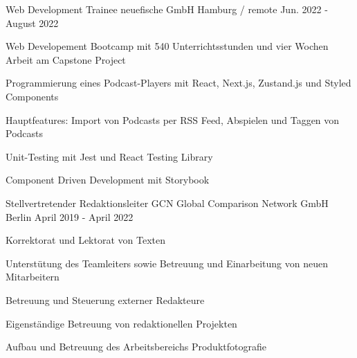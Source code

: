 

\begin{cventries}

  \cventry
    {Web Development Trainee} %
    {neuefische GmbH} %
    {Hamburg / remote} %
    {Jun. 2022 - August 2022} %
    {
      \begin{cvitems} %
        \item {Web Developement Bootcamp mit 540 Unterrichtsstunden und vier Wochen Arbeit am Capstone Project}
        \item {Programmierung eines Podcast-Players mit React, Next.js, Zustand.js und Styled Components}
        \item {Hauptfeatures: Import von Podcasts per RSS Feed, Abspielen und Taggen von Podcasts}
        \item {Unit-Testing mit Jest und React Testing Library}
        \item {Component Driven Development mit Storybook}
      \end{cvitems}
    }

  \cventry
    {Stellvertretender Redaktionsleiter} %
    {GCN Global Comparison Network GmbH} %
    {Berlin} %
    {April 2019 - April 2022} %
    {
      \begin{cvitems} %
        \item {Korrektorat und Lektorat von Texten}
        \item {Unterstütung des Teamleiters sowie Betreuung und Einarbeitung von neuen Mitarbeitern}
        \item {Betreuung und Steuerung externer Redakteure}
        \item {Eigenständige Betreuung von redaktionellen Projekten}
        \item {Aufbau und Betreuung des Arbeitsbereichs Produktfotografie}
      \end{cvitems}
    }


\end{cventries}
